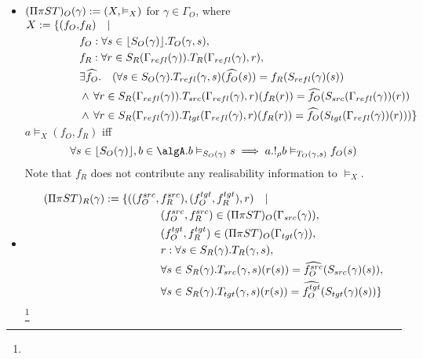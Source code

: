 \documentclass[12pt,a4paper]{article}
\def\src{_{src}}
\def\rfl{_{refl}}
\def\tgt{_{tgt}}
\renewcommand{\O}{_{O}}\alwaysmath{O}
\newcommand{\R}{\ensuremath{_{R}}}
\begin{document}
\begin{itemize}
  \item $(\Pi \pi S T)\O(\gamma) \define (X, \vDash_X)$ for $\gamma \in \Gamma\O$, where
    \subitem
        $\begin{aligned}
          X \define \{ (f\O,& f\R) \quad | \quad \\ 
          & f\O : \forall s \in \lfloor S\O(\gamma) \rfloor.T\O(\gamma, s),\\
          & f\R : \forall r \in S\R(\Gamma\rfl(\gamma)). T\R(\Gamma\rfl(\gamma), r),\\
          & \exists \widehat{f\O} .\quad  (\forall s \in S\O(\gamma). T\rfl(\gamma, s)(\widehat{f\O} (s)) = f\R(S\rfl(\gamma)(s)) \\
          & \wedge\, \forall r \in S\R(\Gamma\rfl(\gamma)). T\src(\Gamma\rfl(\gamma),r)(f\R (r)) = \widehat{f\O}(S\src(\Gamma\rfl(\gamma))(r)) \\
          & \wedge\, \forall r \in S\R(\Gamma\rfl(\gamma)). T\tgt(\Gamma\rfl(\gamma),r)(f\R (r)) = \widehat{f\O}(S\tgt(\Gamma\rfl(\gamma))(r)))  \}
        \end{aligned}$\\
    
    \subitem $a \vDash_X (f\O, f\R)$ iff
    $$\forall s \in \lfloor{S\O(\gamma)}\rfloor, b \in \algA . b \vDash_{S\O(\gamma)} s \implies a . !_\rho b \vDash_{T\O(\gamma,s)} f\O(s)$$
    Note that $f\R$ does not contribute any realisability information to $\vDash_X$.
    
    \item
     \begin{align*}
           (\Pi \pi S T)\R(\gamma)  \define \{( (f\O^{src}, \,& f\R^{src}), (f\O^{tgt}, f\R^{tgt}), r)  \quad|\quad \\
            & (f\O^{src},f\R^{src}) \in (\Pi\pi S T)\O(\Gamma\src(\gamma)),\\
            & (f\O^{tgt},f\R^{tgt}) \in (\Pi\pi S T)\O(\Gamma\tgt(\gamma)),\\
            & r : \forall s \in S\R(\gamma). T\R(\gamma, s),\\     
            & \forall s \in S\R(\gamma). T\src(\gamma, s)( r (s)) = \widehat{f\O^{src}}(S\src(\gamma)(s)),\\
            & \forall s \in S\R(\gamma). T\tgt(\gamma, s)( r (s)) = \widehat{f\O^{tgt}}(S\tgt(\gamma)(s)) \}
      \end{align*}\footnote{}
%    
%     


\end{itemize}
\end{document}
